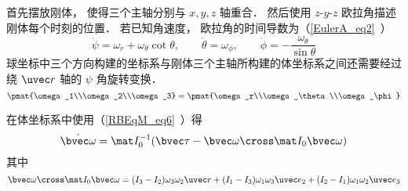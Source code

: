 

首先摆放刚体， 使得三个主轴分别与 $x,y,z$ 轴重合． 然后使用 $z$-$y$-$z$ 欧拉角描述刚体每个时刻的位置． 若已知角速度， 欧拉角的时间导数为（\autoref{EulerA_eq2}~）
\begin{equation}
\dot\psi = \omega_r + \omega_\theta \cot\theta,\qquad
\dot\theta = \omega_\phi,\qquad
\dot\phi = -\frac{\omega_\theta}{\sin\theta}
\end{equation}
球坐标中三个方向构建的坐标系与刚体三个主轴所构建的体坐标系之间还需要经过绕 $\uvec r$ 轴的 $\psi$ 角旋转变换．
\begin{equation}
\pmat{\omega_1\\\omega_2\\\omega_3} = \pmat{\omega_r\\\omega_\theta\\\omega_\phi}
\end{equation}


在体坐标系中使用（\autoref{RBEqM_eq6}~）得
\begin{equation}
\dot{\bvec \omega} = \mat I_0^{-1} (\bvec \tau  - \bvec\omega\cross \mat I_0 \bvec\omega)
\end{equation}
其中
\begin{equation}
\bvec\omega\cross \mat I_0 \bvec\omega = (I_3-I_2)\omega_3\omega_2\uvec r + (I_1-I_3)\omega_1\omega_3\uvec e_2 + (I_2-I_1)\omega_1\omega_2\uvec e_3
\end{equation}

